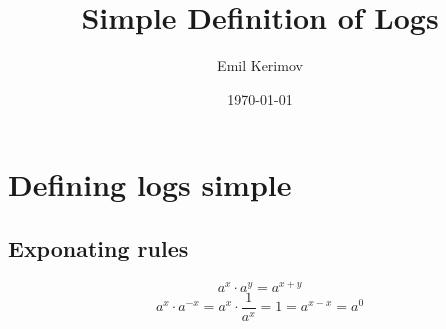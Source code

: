 \documentclass[a4paper]{article}
\title{Simple Definition of Logs}
\author{Emil Kerimov}
\date{\today}
\begin{document}
\maketitle

\newtheorem{theorem}{Theorem}[section]
\newtheorem{corollary}{Corollary}[theorem]
\newtheorem{lemma}[theorem]{Lemma}
\newtheorem{definition}{Definition}[section]


\section{Defining logs simple}\label{logs simple}

\subsection{Exponating rules}\label{Exponating rules}
\begin{equation}\label{a_x_times_a_b}
a^{x} \cdot a^{y}  = a^{x+y}
\end{equation}
\begin{equation}\label{a_0}
a^{x} \cdot a^{-x} = a^{x} \cdot \frac{1}{a^{x}} = 1 = a^{x-x} = a^{0}
\end{equation}
\end{document}
